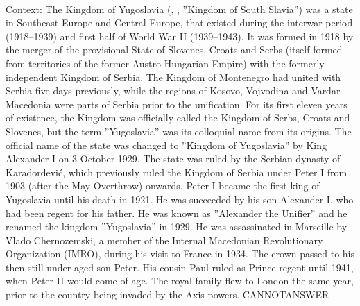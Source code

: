 \documentclass[11pt,a4paper, onecolumn]{article}
\begin{document}
\\ Context: The Kingdom of Yugoslavia (, , ''Kingdom of South Slavia'') was a state in Southeast Europe and Central Europe, that existed during the interwar period (1918–1939) and first half of World War II (1939–1943). It was formed in 1918 by the merger of the provisional State of Slovenes, Croats and Serbs (itself formed from territories of the former Austro-Hungarian Empire) with the formerly independent Kingdom of Serbia. The Kingdom of Montenegro had united with Serbia five days previously, while the regions of Kosovo, Vojvodina and Vardar Macedonia were parts of Serbia prior to the unification. For its first eleven years of existence, the Kingdom was officially called the Kingdom of Serbs, Croats and Slovenes, but the term ''Yugoslavia'' was its colloquial name from its origins. The official name of the state was changed to ''Kingdom of Yugoslavia'' by King Alexander I on 3 October 1929. The state was ruled by the Serbian dynasty of Karađorđević, which previously ruled the Kingdom of Serbia under Peter I from 1903 (after the May Overthrow) onwards. Peter I became the first king of Yugoslavia until his death in 1921. He was succeeded by his son Alexander I, who had been regent for his father. He was known as ''Alexander the Unifier'' and he renamed the kingdom ''Yugoslavia'' in 1929. He was assassinated in Marseille by Vlado Chernozemski, a member of the Internal Macedonian Revolutionary Organization (IMRO), during his visit to France in 1934. The crown passed to his then-still under-aged son Peter. His cousin Paul ruled as Prince regent until 1941, when Peter II would come of age. The royal family flew to London the same year, prior to the country being invaded by the Axis powers. CANNOTANSWER
\end{document}
